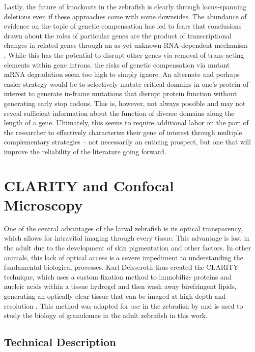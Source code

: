 Lastly, the future of knockouts in the zebrafish is clearly through locus\hyp{}spanning deletions even if these approaches come with some downsides. The abundance of evidence on the topic of genetic compensation has led to fears that conclusions drawn about the roles of particular genes are the product of transcriptional changes in related genes through an as\hyp{}yet unknown RNA\hyp{}dependent mechanism \citep{Rossi2015, ElBrolosy2019}. While this has the potential to disrupt other genes via removal of trans\hyp{}acting elements within gene introns, the risks of genetic compensation via mutant mRNA degradation seem too high to simply ignore. An alternate and perhaps easier strategy would be to selectively mutate critical domains in one's protein of interest to generate in\hyp{}frame mutations that disrupt protein function without generating early stop codons. This is, however, not always possible and may not reveal sufficient information about the function of diverse domains along the length of a gene. Ultimately, this seems to require additional labor on the part of the researcher to effectively characterize their gene of interest through multiple complementary strategies -- not necessarily an enticing prospect, but one that will improve the reliability of the literature going forward.

\section{CLARITY and Confocal Microscopy}\label{clarity}

One of the central advantages of the larval zebrafish is its optical transparency, which allows for intravital imaging through every tissue. This advantage is lost in the adult due to the development of skin pigmentation and other factors. In other animals, this lack of optical access is a severe impediment to understanding the fundamental biological processes. Karl Deisseroth thus created the CLARITY technique, which uses a custom fixation method to immobilize proteins and nucleic acids within a tissue hydrogel and then wash away birefringent lipids, generating an optically clear tissue that can be imaged at high depth and resolution \citep{Chung2013, Yang2014d}. This method was adapted for use in the zebrafish by \citet{Cronan2015} and is used to study the biology of granulomas in the adult zebrafish in this work.

\subsection{Technical Description}\label{clardet}

